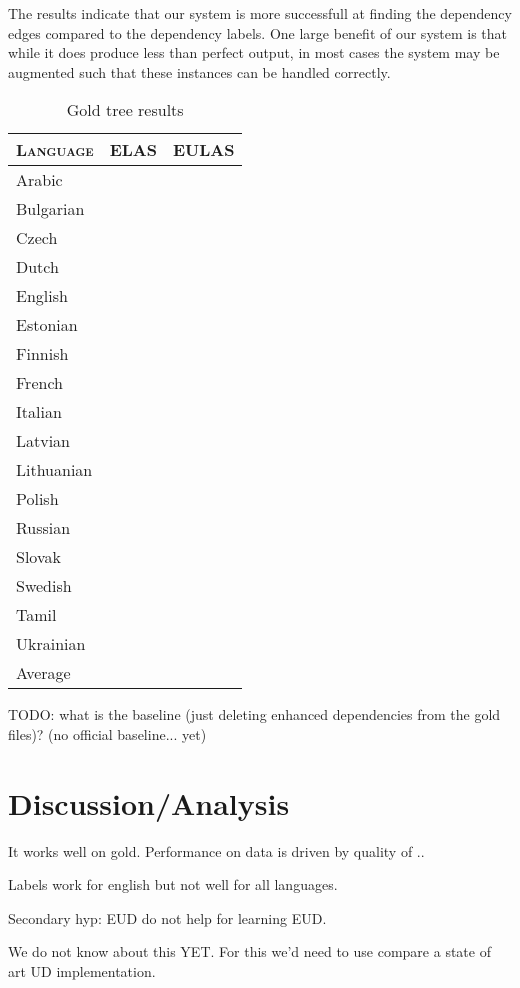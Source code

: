 \documentclass[11pt,a4paper]{article}
\begin{document}
The results indicate that our system is more successfull at
finding the dependency edges compared to the dependency
labels. One large benefit of our system is that while it does
produce less than perfect output, in most cases the system may be
augmented such that these instances can be handled correctly.

    
\begin{table}[h]
	\centering
	\begin{tabular}{l|rr}
		\textsc{Language} & \textsc{ELAS} & \textsc{EULAS} \\
		\hline 
		Arabic &  & \\
		Bulgarian &  & \\
		Czech &  & \\
		Dutch &  & \\
		English &  & \\
		Estonian &  & \\
		Finnish &  & \\
		French &  & \\
		Italian &  & \\
		Latvian &  & \\
		Lithuanian &  & \\
		Polish &  & \\
		Russian &  & \\
		Slovak &  & \\
		Swedish &  & \\
		Tamil &  & \\
		Ukrainian &  & \\
		Average &  & \\ 
	\end{tabular}
	\caption{Gold tree results}
\end{table} 

TODO: what is the baseline (just deleting enhanced dependencies from the gold files)? (no official baseline... yet)

\section{Discussion/Analysis}


It works well on gold.
Performance on data is driven by quality of ..

Labels work for english but not well for all languages.

Secondary hyp: EUD do not help for learning EUD.

We do not know about this YET. For this we'd need to use compare a
state of art UD implementation.
\end{document}
